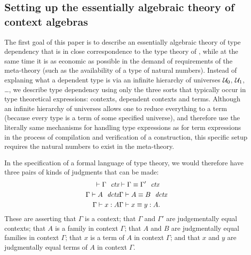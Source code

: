 \subsection*{Setting up the essentially algebraic theory of context algebras}
The first goal of this paper is to describe an essentially algebraic theory of
type dependency that is in close correspondence to the type theory of
\cite{TheBook}, while at the same time it is as economic as possible in the
demand of requirements of the meta-theory (such as the availability of a type of natural numbers). Instead of explaning
what a dependent type is via an infinite hierarchy of universes $\mathcal{U}_0$,
$\mathcal{U}_1$, \ldots, we describe type dependency using only the three sorts
that typically occur in type theoretical expressions: contexts, dependent contexts and 
terms. Although an infinite hierarchy of universes allows one to reduce everything
to a term (because every type is a term of some specified universe), and 
therefore use the literally same mechanisms for handling type expressions as for
term expressions in the process of compilation and verification of a 
construction, this specific setup requires the natural numbers to exist in the 
meta-theory. 

In the specification of a formal language of type theory, we would therefore
have three pairs of kinds of judgments that can be made:
\begin{align*}
\jalign\jctx{\Gamma} 
& \jalign\jctxeq{\Gamma}{\Gamma'}
  \\
\jalign\jfam{\Gamma}{A} 
& \jalign\jfameq{\Gamma}{A}{B}
  \\
\jalign\jterm{\Gamma}{A}{x} 
& \jalign\jtermeq{\Gamma}{A}{x}{y}.
\end{align*}
These are asserting that $\Gamma$ is a context; that $\Gamma$ and $\Gamma'$ are
judgementally equal contexts; that $A$ is a family in context $\Gamma$; that
$A$ and $B$ are judgmentally equal families in context $\Gamma$; that $x$ is
a term of $A$ in context $\Gamma$; and that $x$ and $y$ are judgmentally equal
terms of $A$ in context $\Gamma$. 
 
